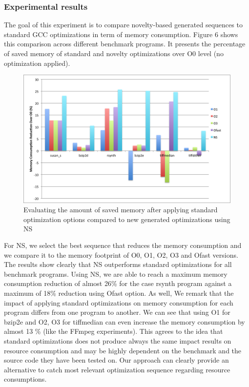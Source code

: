 \subsubsection{Experimental results}

The goal of this experiment is to compare novelty-based generated sequences to standard GCC optimizations in term of memory consumption. Figure 6 shows this comparison across different benchmark programs. It presents the percentage of saved memory of standard and novelty optimizations over O0 level (no optimization applied).
 
\begin{figure}[!ht]
	\centering
	\includegraphics[width=1.\linewidth]{Ressources/infra_novelty_stat3.png}
	\caption{Evaluating the amount of saved memory after applying standard optimization options compared to new generated optimizations using NS}
\end{figure}

For NS, we select the best sequence that reduces the memory consumption and we compare it to the memory footprint of O0, O1, O2, O3 and Ofast versions. The results show clearly that NS outperforms standard optimizations for all benchmark programs. Using NS, we are able to reach a maximum memory consumption reduction of almost 26\% for the case rsynth program against a maximum of 18\% reduction using Ofast option. As well, We remark that the impact of applying standard optimizations on memory consumption for each program differs from one program to another. We can see that using O1 for bzip2e and O2, O3 for tiffmedian can even increase the memory consumption by almost 13 \% (like the FFmpeg experiments). This agrees to the idea that standard optimizations does not produce always the same impact results on resource consumption and may be highly dependent on the benchmark and the source code they have been tested on. Our approach can clearly provide an alternative to catch most relevant optimization sequence regarding resource consumptions.

